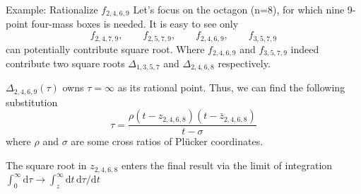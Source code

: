 \documentclass[10pt]{beamer}
\newcommand{\dif}{\mathrm{d}}
\begin{document}
\begin{frame}{Example: Rationalize $f_{2,4,6,9}$}
  Let's focus on the octagon (n=8), for which nine 9-point four-mass boxes is needed. It is easy to see only 
  \begin{equation*}
    f_{2,4,7,9},\qquad f_{2,5,7,9},\qquad f_{2,4,6,9},\qquad f_{3,5,7,9} 
  \end{equation*}
  can potentially contribute square root. Where $f_{2,4,6,9}$ and $f_{3,5,7,9}$ indeed contribute two square roots $\Delta_{1,3,5,7}$ and $\Delta_{2,4,6,8}$ respectively.
 
  $\Delta_{2,4,6,9}(\tau)$ owns $\tau=\infty$ as its rational point. Thus, we can find the following substitution
  \begin{equation*}
    \tau=\frac{\rho (t-z_{2,4,6,8})(t-\bar{z}_{2,4,6,8})}{t-\sigma}
  \end{equation*} 
  where $\rho$ and $\sigma$ are some cross ratios of Pl\"{u}cker coordinates.
 
  The square root in $z_{2,4,6,8}$ enters the final result via the limit of integration $\int_{0}^{\infty} \dif\tau\to \int_{z}^{\infty}\dif t \, \dif \tau/\dif t$
 \end{frame}

\fi
\end{document}
